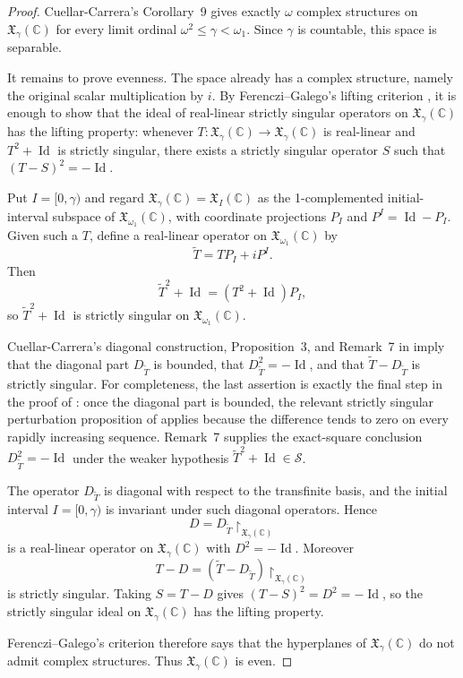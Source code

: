 \documentclass[11pt]{article}
\newcommand{\C}{\mathbb C}
\newcommand{\X}{\mathfrak X}
\newcommand{\Id}{\operatorname{Id}}
\newcommand{\SSing}{\mathcal S}
\begin{document}
\begin{proof}
Cuellar-Carrera's Corollary~9 \cite{CC} gives exactly $\omega$ complex
structures on $\X_\gamma(\C)$ for every limit ordinal
$\omega^2\leq\gamma<\omega_1$.  Since $\gamma$ is countable, this space
is separable.

It remains to prove evenness.  The space already has a complex structure,
namely the original scalar multiplication by $i$.  By
Ferenczi--Galego's lifting criterion \cite[Proposition~13]{FG}, it is
enough to show that the ideal of real-linear strictly singular
operators on $\X_\gamma(\C)$ has the lifting property: whenever
$T\colon \X_\gamma(\C)\to\X_\gamma(\C)$ is real-linear and
$T^2+\Id$ is strictly singular, there exists a strictly singular
operator $S$ such that $(T-S)^2=-\Id$.

Put $I=[0,\gamma)$ and regard $\X_\gamma(\C)=\X_I(\C)$ as the
1-complemented initial-interval subspace of $\X_{\omega_1}(\C)$, with
coordinate projections $P_I$ and $P^I=\Id-P_I$.  Given such a $T$, define
a real-linear operator on $\X_{\omega_1}(\C)$ by
\[
        \widetilde T = T P_I + i P^I .
\]
Then
\[
        \widetilde T^2+\Id = (T^2+\Id)P_I,
\]
so $\widetilde T^2+\Id$ is strictly singular on $\X_{\omega_1}(\C)$.

Cuellar-Carrera's diagonal construction, Proposition~3, and Remark~7 in
\cite{CC} imply that the diagonal part $D_{\widetilde T}$ is bounded,
that $D_{\widetilde T}^2=-\Id$, and that
$\widetilde T-D_{\widetilde T}$ is strictly singular.  For completeness,
the last assertion is exactly the final step in the proof of
\cite[Theorem~2]{CC}: once the diagonal part is bounded, the relevant
strictly singular perturbation proposition
of \cite{CC} applies because the difference tends to zero on every
rapidly increasing sequence.  Remark~7 supplies the exact-square
conclusion $D_{\widetilde T}^2=-\Id$ under the weaker hypothesis
$\widetilde T^2+\Id\in\SSing$.

The operator $D_{\widetilde T}$ is diagonal with respect to the
transfinite basis, and the initial interval $I=[0,\gamma)$ is invariant
under such diagonal operators.  Hence
\[
        D = D_{\widetilde T}\!\restriction_{\X_\gamma(\C)}
\]
is a real-linear operator on $\X_\gamma(\C)$ with $D^2=-\Id$.  Moreover
\[
        T-D = (\widetilde T-D_{\widetilde T})
              \!\restriction_{\X_\gamma(\C)}
\]
is strictly singular.  Taking $S=T-D$ gives $(T-S)^2=D^2=-\Id$, so the
strictly singular ideal on $\X_\gamma(\C)$ has the lifting property.

Ferenczi--Galego's criterion therefore says that the hyperplanes of
$\X_\gamma(\C)$ do not admit complex structures.  Thus
$\X_\gamma(\C)$ is even.
\end{proof}
\end{document}

